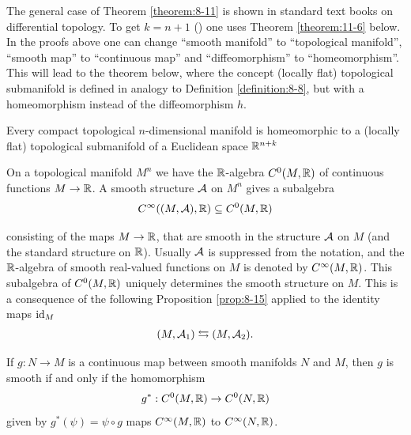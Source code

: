 \begin{remark}\label{remark:8-13}
  The general case of Theorem \ref{theorem:8-11} is shown in standard text books
on differential topology. To get $k = n + 1$ ()
one uses Theorem \ref{theorem:11-6} below. In the proofs above one can change ``smooth
manifold'' to ``topological manifold'', ``smooth map'' to ``continuous map'' and
``diffeomorphism'' to ``homeomorphism''. This will lead to the theorem below,
where the concept (locally flat) topological submanifold is defined in analogy to
Definition \ref{definition:8-8}, but with a homeomorphism instead of the diffeomorphism $h$.
\end{remark}

\begin{theorem}\label{theorem:8-14}
  Every compact topological $n$-dimensional manifold is homeomorphic to a (locally flat) 
  topological submanifold of a Euclidean space ${\mathbb{R}}^{n+k}$
\end{theorem}

On a topological manifold $M^n$ we have the ${\mathbb{R}}$-algebra $C^0(M, {\mathbb{R}})$ of continuous
functions $M\to{\ensuremath{\mathbb{R}}}$. A smooth structure $\mathcal{A}$ on $M^n$ gives a subalgebra
\begin{align*}
  C^\infty((M, \mathcal{A}), {\mathbb{R}})\subseteq C^0(M, {\mathbb{R}})
\end{align*}

consisting of the maps $M\to {\ensuremath{\mathbb{R}}}$, that are smooth in the structure $\mathcal{A}$ on $M$ (and
the standard structure on ${\mathbb{R}}$). Usually $\mathcal{A}$ is suppressed from the notation, and the
${\mathbb{R}}$-algebra of smooth real-valued functions on $M$ is denoted by $C^\infty(M, {\mathbb{R}})$. This
subalgebra of $C^0(M, {\mathbb{R}})$ uniquely determines the smooth structure on $M$. This is
a consequence of the following Proposition \ref{prop:8-15} applied to the identity maps $\operatorname{id}_M$
\begin{align*}
  (M, \mathcal{A}_1) \leftrightarrows (M, \mathcal{A}_2).
\end{align*}

\begin{proposition}\label{prop:8-15}
  If $g:N\to M$ is a continuous map between smooth manifolds $N$ and $M$, then $g$ is smooth 
  if and only if the homomorphism
  \begin{align*}
    g^*:C^0(M, {\mathbb{R}})\to C^0(N, {\mathbb{R}})
  \end{align*}
  given by $g^*(\psi) = \psi\circ g$ maps $C^\infty(M, {\mathbb{R}})$ to $C^\infty(N, {\mathbb{R}})$.
\end{proposition}


